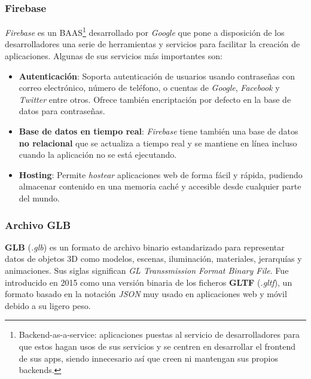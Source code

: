 \subsubsection*{Firebase}
\textit{Firebase}\cite{firebase} es un BAAS\footnote{Backend-as-a-service: aplicaciones puestas al servicio de desarrolladores para que estos hagan usos de sus servicios y se centren en desarrollar el frontend de sus apps, siendo innecesario así que creen ni mantengan sus propios backends.} desarrollado por \textit{Google} que pone a disposición de los desarrolladores una serie de herramientas y servicios para facilitar la creación de aplicaciones. Algunas de sus servicios más importantes son:

\begin{itemize}
    \item \textbf{Autenticación}: Soporta autenticación de usuarios usando contraseñas con correo electrónico, número de teléfono, o cuentas de \textit{Google}, \textit{Facebook} y \textit{Twitter} entre otros. Ofrece también encriptación por defecto en la base de datos para contraseñas.
    \item \textbf{Base de datos en tiempo real}: \textit{Firebase} tiene también una base de datos \textbf{no relacional} que se actualiza a tiempo real y se mantiene en línea incluso cuando la aplicación no se está ejecutando.
    \item \textbf{Hosting}: Permite \textit{hostear} aplicaciones web de forma fácil y rápida, pudiendo almacenar contenido en una memoria caché y accesible desde cualquier parte del mundo.
\end{itemize}

\subsubsection*{Archivo GLB}
\textbf{GLB} (\textit{.glb}) es un formato de archivo binario estandarizado para representar datos de objetos 3D como modelos, escenas, iluminación, materiales, jerarquías y animaciones. Sus siglas significan \textit{GL Transsmission Format Binary File}. Fue introducido en 2015 como una versión binaria de los ficheros \textbf{GLTF} (\textit{.gltf}), un formato basado en la notación \textit{JSON} muy usado en aplicaciones web y móvil debido a su ligero peso.
